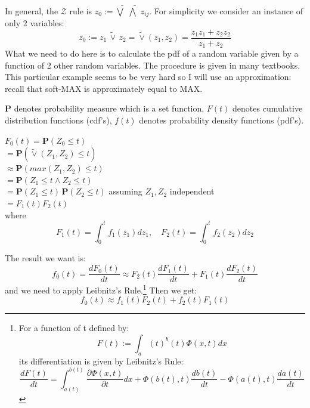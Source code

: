 In general, the $\mathcal{Z}$ rule is $ z_0 := \widetilde{\bigvee} \; \widetilde{\bigwedge} \; z_{ij} $.  For simplicity we consider an instance of only 2 variables:  $$z_0 := z_1 \, \widetilde{\vee} \, z_2 = \widetilde{\vee}(z_1,z_2) = \frac{z_1 z_1 + z_2 z_2}{z_1 + z_2} $$
What we need to do here is to calculate the pdf of a random variable given by a function of 2 other random variables.  The procedure is given in many textbooks.  This particular example seems to be very hard so I will use an approximation:  recall that soft-MAX is approximately equal to MAX.

$\mathbf{P}$ denotes probability measure which is a set function, $F(t)$ denotes cumulative distribution functions (cdf's), $f(t)$ denotes probability density functions (pdf's).


\hspace*{1.2cm} $ F_0(t) = \mathbf{P}(Z_0 \leq t)$\\
\hspace*{2cm} $= \mathbf{P}(\widetilde{\vee}(Z_1,Z_2) \leq t)$\\
\hspace*{2cm} $\approx \mathbf{P}(max(Z_1,Z_2) \leq t)$\\
\hspace*{2cm} $= \mathbf{P}(Z_1 \leq t \wedge Z_2 \leq t)$\\
\hspace*{2cm} $= \mathbf{P}(Z_1 \leq t) \, \mathbf{P}(Z_2 \leq t)$ \quad assuming $Z_1, Z_2$ independent\\
\hspace*{2cm} $= F_1(t) F_2(t)$\\
where $$ F_1(t) = \int_0^t f_1(z_1) dz_1 , \quad F_2(t) = \int_0^t f_2(z_2) dz_2$$

The result we want is:
\[ f_0(t) = \frac{dF_0(t)}{dt} \approx F_2(t) \frac{dF_1(t)}{dt} + F_1(t) \frac{dF_2(t)}{dt} \]
and we need to apply Leibnitz's Rule.\footnote{For a function of t defined by: $$ F(t) := \int_a(t)^b(t) \Phi(x,t) dx $$ its differentiation is given by Leibnitz's Rule: $$ \frac{dF(t)}{dt} = \int_{a(t)}^{b(t)} \frac{\partial\Phi(x,t)}{\partial t} dx + \Phi(b(t),t) \frac{db(t)}{dt} - \Phi(a(t),t) \frac{da(t)}{dt} $$ }  Then we get:
\begin{equation}
f_0(t) \approx f_1(t) F_2(t) + f_2(t) F_1(t)
\end{equation}

